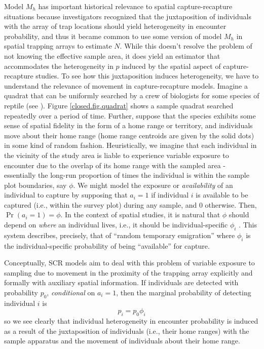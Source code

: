 Model $M_{h}$ has important historical relevance to spatial
capture-recapture situations \citep{karanth:1995} because
investigators recognized that the juxtaposition of individuals with
the array of trap locations should yield heterogeneity in encounter
probability, and thus it became common to use some version of model
$M_h$ in spatial trapping arrays to estimate $N$.  While this doesn't
resolve the problem of not knowing the effective sample area, 
it does yield an estimator that accommodates the heterogeneity in $p$
induced by the spatial aspect of capture-recapture studies.
To see how this juxtaposition induces heterogeneity, we have to
understand the relevance of movement in capture-recapture models.
Imagine a quadrat that can be uniformly searched by a crew of
biologists for some species of reptile (see \citet{royle_young:2008}).
Figure \ref{closed.fig.quadrat} shows a sample quadrat searched
repeatedly over a period of time. Further, suppose that the species
exhibits some sense of spatial fidelity in the form of a home range or
territory, and individuals move about their home range (home range
centroids are given by the solid dots) in some kind of random fashion.
Heuristically, we imagine that each individual in
the vicinity of the study area is liable to experience variable
exposure to encounter due to the overlap of its home range with the
sampled area - essentially the long-run proportion of times the
individual is within the sample plot boundaries, say $\phi$. We
might model the exposure or {\it availability} of an individual to 
capture by supposing that
$a_{i} = 1$ if individual $i$ is available to be captured (i.e.,
within the survey plot) during any sample, and $0$ otherwise. Then,
$\Pr(a_{i}=1) = \phi$.  In the context of spatial studies, it is
natural that $\phi$ should depend on {\it where} an individual lives,
i.e., it should be individual-specific $\phi_{i}$
\citep{chandler_etal:2011}. This system describes, precisely, that of
``random temporary emigration'' \citep{kendall_etal:1997} where $\phi_{i}$
is the individual-specific probability of being ``available'' for
capture.

Conceptually, SCR models aim to deal with
this problem of variable exposure to sampling due to movement in the
proximity of the trapping array explicitly and formally with auxiliary
spatial information.  If individuals are detected with probability
$p_{0}$, {\it conditional} on $a_{i} = 1$, then the marginal
probability of detecting  individual $i$ is
\[
 p_{i} = p_{0}\phi_{i}
\]
so we see clearly that individual heterogeneity in encounter
probability is induced as a result of the juxtaposition of individuals
(i.e., their home ranges) with the sample apparatus and the movement
of individuals about their home range.

